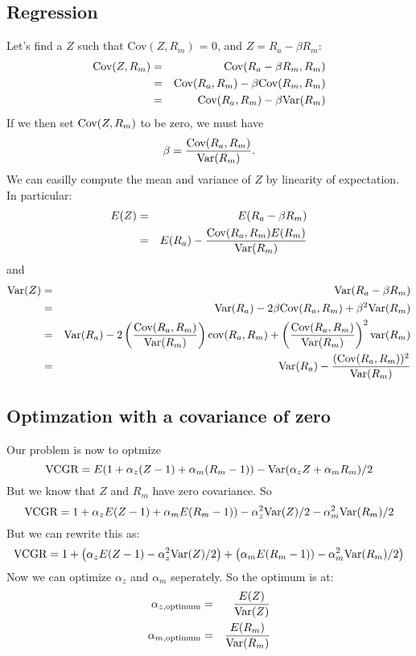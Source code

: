 \documentclass{article}
\begin{document}
\subsection*{Regression}

Let's find a $Z$ such that Cov$(Z,R_m)$ = 0, and $Z = R_a - \beta R_m$:
\begin{eqnarray*}
\hbox{Cov}(Z,R_m) &=& \hbox{Cov}(R_a - \beta R_m,R_m)  \\
                  &=& \hbox{Cov}(R_a,R_m)  - \beta \hbox{Cov}(R_m,R_m) \\
                  &=& \hbox{Cov}(R_a,R_m)  - \beta \hbox{Var}(R_m) 
\end{eqnarray*}
If we then set $\hbox{Cov}(Z,R_m)$ to be zero, we must have 
$$\beta = \frac{\hbox{Cov}(R_a,R_m)}{\hbox{Var}(R_m)}.$$
We can easilly compute the mean and variance of $Z$ by linearity of
expectation.  In particular:
\begin{eqnarray*}
E(Z) &=& E(R_a - \beta R_m) \\
     &=& E(R_a) - \frac{\hbox{Cov}(R_a,R_m)E(R_m)}{\hbox{Var}(R_m)}
\end{eqnarray*}
and
\begin{eqnarray*}
\hbox{Var}(Z) &=& \hbox{Var}(R_a - \beta R_m) \\
     &=& \hbox{Var}(R_a) - 2 \beta \hbox{Cov}(R_a,R_m) + \beta^2 \hbox{Var}(R_m)\\
     &=& \hbox{Var}(R_a) - 2
\left(\frac{\hbox{Cov}(R_a,R_m)}{\hbox{Var}(R_m)}\right) \hbox{cov}(R_a,R_m) +
\left(\frac{\hbox{Cov}(R_a,R_m)}{\hbox{Var}(R_m)}\right)^2 \hbox{var}(R_m)\\
     &=& \hbox{Var}(R_a) - \frac{(\hbox{Cov}(R_a,R_m))^2}{\hbox{Var}(R_m)} 
\end{eqnarray*}
\subsection*{Optimzation with a covariance of zero}

Our problem is now to optmize
$$\hbox{VCGR} = E(1 + \alpha_z (Z - 1) + \alpha_m (R_m - 1)) - \hbox{Var}(\alpha_z
Z + \alpha_m R_m)/2$$
But we know that $Z$ and $R_m$ have zero covariance.  So
$$\hbox{VCGR} = 1 + \alpha_z E(Z - 1) + \alpha_m E(R_m - 1)) -
\alpha_z^2\hbox{Var}(Z)/2 -\alpha_m^2 \hbox{Var}(R_m)/2$$
But we can rewrite this as:
$$\hbox{VCGR} = 1 + \left(\alpha_z E(Z - 1) -
\alpha_z^2\hbox{Var}(Z)/2\right)  + \left(\alpha_m E(R_m - 1)) -\alpha_m^2 \hbox{Var}(R_m)/2\right)$$
Now we can optimize $\alpha_z$ and $\alpha_m$ seperately.  So the
optimum is at:
\begin{eqnarray*}
\alpha_{z,\hbox{\scriptsize optimum}} &=& \displaystyle \frac{E(Z)}{\hbox{Var}(Z)} \\
\alpha_{m,\hbox{\scriptsize optimum}} &=& \displaystyle
\frac{E(R_m)}{\hbox{Var}(R_m)}
\end{eqnarray*}
\end{document}
